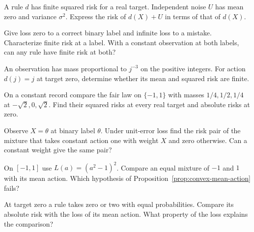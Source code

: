 \documentclass[11pt,oneside]{book}
\theoremstyle{definition}
\theoremstyle{remark}
\begin{document}
\begin{practiceexercise}
\label{wex:noise-adds-square-risk}
A rule $d$ has finite squared risk for a real target. Independent noise $U$
has mean zero and variance $\sigma^2$. Express the risk of $d(X)+U$ in terms
of that of $d(X)$.
\end{practiceexercise}

\begin{practiceexercise}
\label{wex:infinite-error-penalty}
Give loss zero to a correct binary label and infinite loss to a mistake.
Characterize finite risk at a label. With a constant observation at both
labels, can any rule have finite risk at both?
\end{practiceexercise}

\begin{practiceexercise}
\label{wex:countable-infinite-variance}
An observation has mass proportional to $j^{-3}$ on the positive integers.
For action $d(j)=j$ at target zero, determine whether its mean and squared
risk are finite.
\end{practiceexercise}

\begin{practiceexercise}
\label{wex:equal-square-risk-different-laws}
On a constant record compare the fair law on $\{-1,1\}$ with masses
$1/4,1/2,1/4$ at $-\sqrt2,0,\sqrt2$. Find their squared risks at every real
target and absolute risks at zero.
\end{practiceexercise}

\begin{practiceexercise}
\label{wex:data-dependent-risk-mixture}
Observe $X=\theta$ at binary label $\theta$. Under unit-error loss find the
risk pair of the mixture that takes constant action one with weight $X$ and
zero otherwise. Can a constant weight give the same pair?
\end{practiceexercise}

\begin{practiceexercise}
\label{wex:nonconvex-mean-action}
On $[-1,1]$ use $L(a)=(a^2-1)^2$. Compare an equal mixture of $-1$ and $1$
with its mean action. Which hypothesis of
Proposition~\ref{prop:convex-mean-action} fails?
\end{practiceexercise}

\begin{practiceexercise}
\label{wex:absolute-loss-jensen-tie}
At target zero a rule takes zero or two with equal probabilities. Compare
its absolute risk with the loss of its mean action. What property of the
loss explains the comparison?
\end{practiceexercise}
\end{document}
